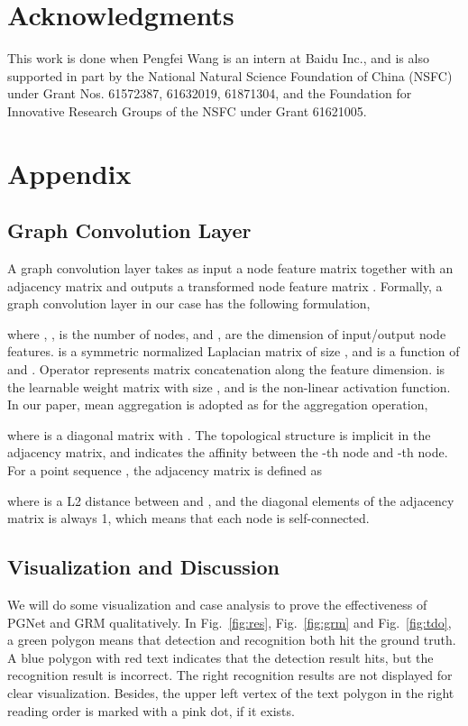 \documentclass[letterpaper]{article} \usepackage{aaai21}  \usepackage{times}  \usepackage{helvet} \usepackage{courier}  \usepackage[hyphens]{url}  \usepackage{graphicx} \urlstyle{rm} \def\UrlFont{\rm}  \usepackage{natbib}  \usepackage{caption} \usepackage{bm}
\begin{document}
\section*{Acknowledgments}
This work is done when Pengfei Wang is an intern at Baidu Inc., and is also supported in part by the National Natural Science Foundation of China (NSFC) under Grant Nos. 61572387, 61632019, 61871304, and the Foundation for Innovative Research Groups of the NSFC under Grant 61621005. 



\section{Appendix}
\subsection{Graph Convolution Layer}
A graph convolution layer takes as input a node feature matrix  together with an adjacency matrix  and outputs a transformed node feature matrix .
Formally, a graph convolution layer in our case has the following formulation,

where , ,  is the number of nodes, and ,  are the dimension of input/output node features.
 is a symmetric normalized Laplacian matrix of size , and  is a function of  and . 
Operator  represents matrix concatenation along the feature dimension.
 is the learnable weight matrix with size , and  is the non-linear activation function. In our paper, mean aggregation is adopted as  for the aggregation operation, 

where  is a diagonal matrix with . The topological structure is implicit in the adjacency matrix, and  indicates the affinity between the -th node and -th node. For a point sequence ,  the adjacency matrix is defined as

where  is a L2 distance between  and , and the diagonal elements of the adjacency matrix is always 1, which means that each node is self-connected. 

\subsection{Visualization and Discussion}
We will do some visualization and case analysis to prove the effectiveness of PGNet and GRM qualitatively. In Fig.~\ref{fig:res},  Fig.~\ref{fig:grm} and Fig.~\ref{fig:tdo}, a green polygon means that detection and recognition both hit the ground truth. A blue polygon with red text indicates that the detection result hits, but the recognition result is incorrect. The right recognition results are not displayed for clear visualization. Besides, the upper left vertex of the text polygon in the right reading order is marked with a pink dot, if it exists. 
\end{document}
